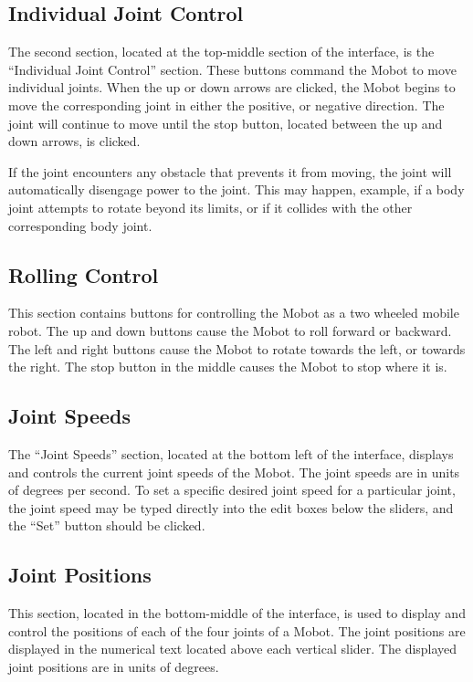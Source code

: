\documentclass{article}
\begin{document}
\subsection{Individual Joint Control}
The second section, located at the top-middle section of the interface,
is the ``Individual Joint Control'' section. These buttons command the
Mobot to move individual joints. When the up or down arrows are clicked,
the Mobot begins to move the corresponding joint in either the positive,
or negative direction. The joint will continue to move until the stop 
button, located between the up and down arrows, is clicked. 

If the joint encounters any obstacle that prevents it from moving, the 
joint will automatically disengage power to the joint. This may happen, 
example, if a body joint attempts to rotate beyond its limits,
or if it collides with the other corresponding body joint. 

\subsection{Rolling Control}
This section contains buttons for controlling the Mobot as a 
two wheeled mobile robot. The up and down buttons cause the Mobot to
roll forward or backward. The left and right buttons cause the Mobot 
to rotate towards the left, or towards the right. The stop button in the
middle causes the Mobot to stop where it is.

\subsection{Joint Speeds}
The ``Joint Speeds'' section, located at the bottom left of the interface,
displays and controls the current joint speeds of the Mobot.
The joint speeds are in units of degrees per second. To set a specific 
desired joint speed for a particular joint, the joint speed may be 
typed directly into the edit boxes below the sliders, and the ``Set''
button should be clicked.
 
\subsection{Joint Positions}
This section, located in the bottom-middle of the interface, is used to display
and control the positions of each of the four
joints of a Mobot. The joint positions are displayed in the numerical
text located above each vertical slider. The displayed joint positions are in
units of degrees.  
\end{document}
